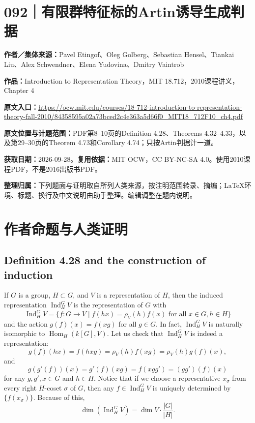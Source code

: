 \documentclass[UTF8,11pt,a4paper]{ctexart}
\theoremstyle{definition}\newtheorem*{definition}{Definition}
\theoremstyle{remark}\newtheorem*{remark}{Remark}
\DeclareMathOperator{\Hom}{Hom}
\DeclareMathOperator{\Ind}{Ind}
\begin{document}
\section*{092｜有限群特征标的Artin诱导生成判据}
\textbf{作者／集体来源：}Pavel Etingof、Oleg Golberg、Sebastian Hensel、Tiankai Liu、Alex Schwendner、Elena Yudovina、Dmitry Vaintrob

\textbf{作品：}Introduction to Representation Theory，MIT 18.712，2010课程讲义，Chapter 4

\textbf{原文入口：}\url{https://ocw.mit.edu/courses/18-712-introduction-to-representation-theory-fall-2010/84358595a02a73bced2c4e363a5d66f0_MIT18_712F10_ch4.pdf}

\textbf{原文位置与计题范围：}PDF第8--10页的Definition 4.28、Theorems 4.32--4.33，以及第29--30页的Theorem 4.73和Corollary 4.74；只按Artin判据计一道。

\textbf{获取日期：}2026-09-28。\quad\textbf{复用依据：}MIT OCW，CC BY-NC-SA 4.0。使用2010课程PDF，不是2016出版书PDF。

\textbf{整理归属：}下列题面与证明取自所列人类来源，按注明范围转录、摘编；LaTeX环境、标题、换行及中文说明由助手整理。编辑调整在题内说明。

\section*{作者命题与人类证明}

\subsection*{Definition 4.28 and the construction of induction}
If $G$ is a group, $H\subset G$, and $V$ is a representation of $H$, then the induced representation $\Ind_H^G V$ is the representation of $G$ with
\[
\Ind_H^G V=\{f:G\to V\mid f(hx)=\rho_V(h)f(x)\text{ for all }x\in G,h\in H\}
\]
and the action $g(f)(x)=f(xg)$ for all $g\in G$.
In fact, $\Ind_H^G V$ is naturally isomorphic to $\Hom_H(k[G],V)$.
Let us check that $\Ind_H^G V$ is indeed a representation:
\[
g(f)(hx)=f(hxg)=\rho_V(h)f(xg)=\rho_V(h)g(f)(x),
\]
and
\[
g(g'(f))(x)=g'(f)(xg)=f(xgg')=(gg')(f)(x)
\]
for any $g,g',x\in G$ and $h\in H$.
Notice that if we choose a representative $x_\sigma$ from every right $H$-coset $\sigma$ of $G$, then any $f\in\Ind_H^G V$ is uniquely determined by $\{f(x_\sigma)\}$. Because of this,
\[
\dim(\Ind_H^G V)=\dim V\cdot\frac{|G|}{|H|}.
\]
\end{document}
